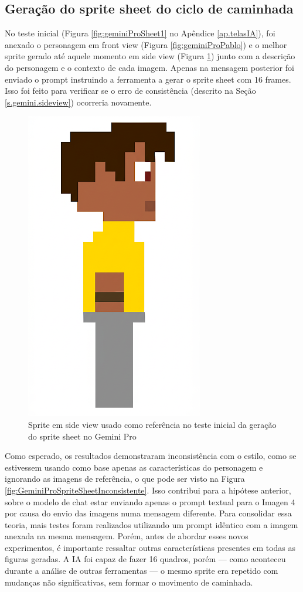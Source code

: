 \FloatBarrier
\subsection{Geração do sprite sheet do ciclo de caminhada}
\label{s.gemini.spritesheet}

No teste inicial (Figura \ref{fig:geminiProSheet1} no Apêndice \ref{ap.telasIA}), foi anexado o personagem em front view (Figura \ref{fig:geminiProPablo}) e o melhor sprite gerado até aquele momento em side view (Figura \ref{fig:GeminiProSpriteSheetSide}) junto com a descrição do personagem e o contexto de cada imagem. Apenas na mensagem posterior foi enviado o prompt instruindo a ferramenta a gerar o sprite sheet com 16 frames. Isso foi feito para verificar se o erro de consistência (descrito na Seção \ref{s.gemini.sideview}) ocorreria novamente. 

\begin{figure}[htbp]
    \centering
    \caption{\small Sprite em side view usado como referência no teste inicial da geração do sprite sheet no Gemini Pro}
    \label{fig:GeminiProSpriteSheetSide}
    \includegraphics[width=0.3\linewidth]{figs/geminiPro/chat6/tela2_res4.png}
\end{figure}

Como esperado, os resultados demonstraram inconsistência com o estilo, como se estivessem usando como base apenas as características do personagem e ignorando as imagens de referência, o que pode ser visto na Figura \ref{fig:GeminiProSpriteSheetInconsistente}. Isso contribui para a hipótese anterior, sobre o modelo de chat estar enviando apenas o prompt textual para o Imagen 4 por causa do envio das imagens numa mensagem diferente. Para consolidar essa teoria, mais testes foram realizados utilizando um prompt idêntico com a imagem anexada na mesma mensagem. Porém, antes de abordar esses novos experimentos, é importante ressaltar outras características presentes em todas as figuras geradas. A IA foi capaz de fazer 16 quadros, porém — como aconteceu durante a análise de outras ferramentas — o mesmo sprite era repetido com mudanças não significativas, sem formar o movimento de caminhada. 


